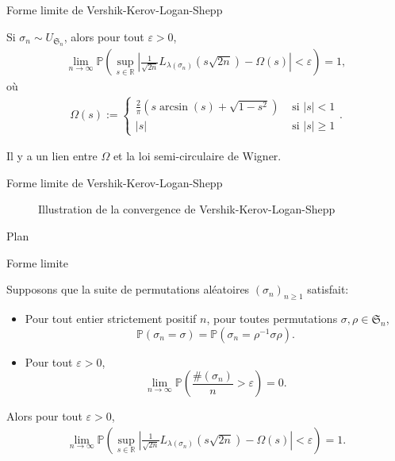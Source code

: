\documentclass[english]{beamer}
\begin{document}
\begin{frame}{Forme limite de Vershik-Kerov-Logan-Shepp}
    \begin{theorem}
    Si $\sigma_n \sim U_{\mathfrak{S}_n}$, alors pour tout $\varepsilon>0$,
\begin{align*}
\lim_{n\to \infty} \mathbb{P}\left(\sup_{s\in \mathbb{R}} \left|\frac{1}{\sqrt{2n}}L_{\lambda(\sigma_n)}\left({s}{\sqrt{2n}}\right)-\Omega(s)\right|<\varepsilon\right) =1,
\end{align*}
où
\begin{align*}
\Omega(s):=\begin{cases}
\frac{2}{\pi}(s\arcsin({s})+\sqrt{1-s^2}) & \text{ si } |s|<1 \\ 
|s| & \text{ si } |s|\geq 1 
\end{cases}.
\end{align*}
    \end{theorem}
    \vspace{10 mm}

    Il y a un lien entre $\Omega$ et la loi semi-circulaire de Wigner.
\end{frame}
\begin{frame}{Forme limite de Vershik-Kerov-Logan-Shepp}
    \begin{figure}[ht]
    \centering
     \def\svgscale{.65}
    
       

    \caption{Illustration de la convergence de   Vershik-Kerov-Logan-Shepp}
\end{figure}

\end{frame}
\begin{frame}{Plan}
\tableofcontents[currentsection,currentsubsection,
    hideothersubsections, 
    sectionstyle=show/shaded,
]
\end{frame}

 \begin{frame}{Forme limite}
    \begin{theorem}[\cite{sk}]
Supposons que la suite de permutations aléatoires  $(\sigma_n)_{n\geq 1}$ satisfait:
\begin{itemize}
\item  Pour tout entier strictement positif $n$, pour toutes permutations  $\sigma,\rho \in \mathfrak{S}_n$,
\begin{equation*}
\mathbb{P}(\sigma_n=\sigma)=\mathbb{P}(\sigma_n=\rho^{-1}\sigma\rho).
\end{equation*}
\item Pour tout $\varepsilon>0$,
\begin{equation*}
\lim_{n\to \infty}\mathbb{P}\left(\frac{\#(\sigma_n)}{n} >\varepsilon\right) =0.
\end{equation*}
\end{itemize}
Alors pour  tout  $\varepsilon>0$,
\begin{align*}
\lim_{n\to \infty} \mathbb{P}\left(\sup_{s\in \mathbb{R}} \left|\frac{1}{\sqrt{2n}}L_{\lambda(\sigma_n)}\left({s}{\sqrt{2n}}\right)-\Omega(s)\right|<\varepsilon\right) =1.
\end{align*}
\end{theorem}
\end{frame}
\end{document}
